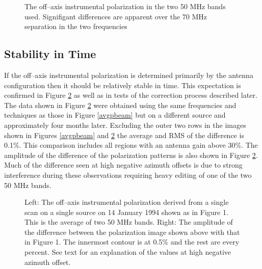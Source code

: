 \begin{figure}
\centerline{\hbox{}
   \hbox{}}
\caption{
The off--axis instrumental polarization in the two 50 MHz bands used.
Signifigant differences are apparent over the 70 MHz separation in the
two frequencies
}
\label{compbeam}
\end{figure}


\subsection {Stability in Time}

   If the off--axis instrumental polarization is determined primarily
by the antenna configuration then it should be relatively stable in
time.  This expectation is confirmed in Figure \ref{laterbeam} as well
as in tests of the correction process described later.  The data shown
in Figure \ref{laterbeam} were obtained using the same frequencies
and techniques as those in Figure \ref{avgpbeam} but on a different
source and approximately four months later.  Excluding the outer two
rows in the images shown in Figures \ref{avgpbeam} and \ref{laterbeam}
the average and RMS of the difference is 0.1\%.
This comparison includes all regions with an antenna gain above 30\%.
The amplitude of the difference of the polarization patterns is also
shown in Figure \ref{laterbeam}.
Much of the difference seen at high negative azimuth offsets is due to
strong interference during these observations requiring heavy editing
of one of the two 50 MHz bands.

\begin{figure}
\centerline{\hbox{}
   \hbox{}}
\caption{
Left: The off--axis instrumental polarization derived from a single
scan on a single source on 14 January 1994 shown as in Figure 1.
This is the average of two 50 MHz bands.
\hfill\break
Right: The amplitude of the difference between the polarization image
shown above with that in Figure 1.  The innermost contour is at 0.5\%
and the rest are every percent.  See text for an explanation of the
values at high negative azimuth offset.
}
\label{laterbeam}
\end{figure}

